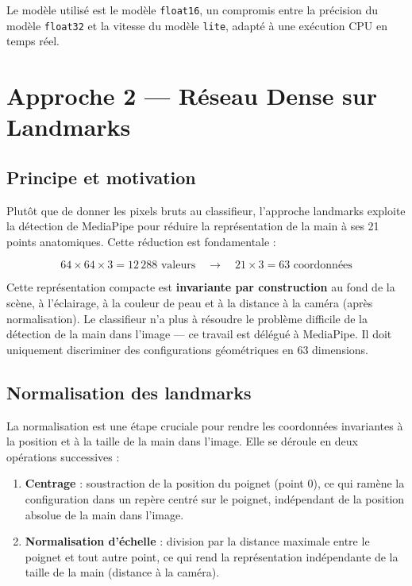 \documentclass[12pt, a4paper]{article}
\newcommand{\code}[1]{\texttt{\small #1}}
\begin{document}
Le modèle utilisé est le modèle \code{float16}, un compromis entre la précision
du modèle \code{float32} et la vitesse du modèle \code{lite}, adapté à une
exécution CPU en temps réel.

\section{Approche 2 --- Réseau Dense sur Landmarks}
\label{sec:landmarks}

\subsection{Principe et motivation}

Plutôt que de donner les pixels bruts au classifieur, l'approche landmarks
exploite la détection de MediaPipe pour réduire la représentation de la main
à ses 21 points anatomiques. Cette réduction est fondamentale :

\[
64 \times 64 \times 3 = 12\,288 \text{ valeurs} \quad \longrightarrow \quad
21 \times 3 = 63 \text{ coordonnées}
\]

Cette représentation compacte est \textbf{invariante par construction} au fond
de la scène, à l'éclairage, à la couleur de peau et à la distance à la caméra
(après normalisation). Le classifieur n'a plus à résoudre le problème difficile
de la détection de la main dans l'image --- ce travail est délégué à MediaPipe.
Il doit uniquement discriminer des configurations géométriques en 63 dimensions.

\subsection{Normalisation des landmarks}

La normalisation est une étape cruciale pour rendre les coordonnées invariantes
à la position et à la taille de la main dans l'image. Elle se déroule en deux
opérations successives :

\begin{enumerate}
  \item \textbf{Centrage} : soustraction de la position du poignet (point 0),
        ce qui ramène la configuration dans un repère centré sur le poignet,
        indépendant de la position absolue de la main dans l'image.
  \item \textbf{Normalisation d'échelle} : division par la distance maximale
        entre le poignet et tout autre point, ce qui rend la représentation
        indépendante de la taille de la main (distance à la caméra).
\end{enumerate}
\end{document}

